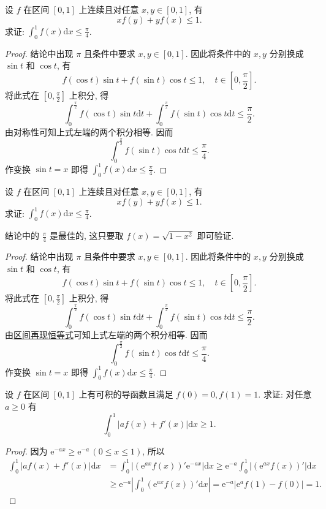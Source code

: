 \documentclass[../../main.tex]{subfiles}
\begin{document}
\begin{example}
设 $f$ 在区间 $[0,1]$ 上连续且对任意 $x,y\in[0,1]$, 有
$$xf(y)+yf(x)\leqslant 1.$$
求证: $\int_0^1 f(x)\mathrm{d}x\leqslant \frac{\pi}{4}$.
\end{example}
\begin{proof}
结论中出现 $\pi$ 且条件中要求 $x,y\in[0,1]$. 因此将条件中的 $x,y$ 分别换成 $\sin t$ 和 $\cos t$, 有
$$f(\cos t)\sin t+f(\sin t)\cos t\leqslant 1,\quad t\in\left[0,\frac{\pi}{2}\right].$$
将此式在 $\left[0,\frac{\pi}{2}\right]$ 上积分, 得
$$\int_0^{\frac{\pi}{2}}f(\cos t)\sin t\mathrm{d}t+\int_0^{\frac{\pi}{2}}f(\sin t)\cos t\mathrm{d}t\leqslant \frac{\pi}{2}.$$
由对称性可知上式左端的两个积分相等. 因而
$$\int_0^{\frac{\pi}{2}}f(\sin t)\cos t\mathrm{d}t\leqslant \frac{\pi}{4}.$$
作变换 $\sin t=x$ 即得 $\int_0^1 f(x)\mathrm{d}x\leqslant \frac{\pi}{4}$.
\end{proof}

\begin{example}
设 $f$ 在区间 $[0,1]$ 上连续且对任意 $x,y\in[0,1]$, 有
$$xf(y)+yf(x)\leqslant 1.$$
求证: $\int_0^1 f(x)\mathrm{d}x\leqslant \frac{\pi}{4}$.
\end{example}
\begin{remark}
结论中的 $\frac{\pi}{4}$ 是最佳的, 这只要取 $f(x)=\sqrt{1-x^2}$ 即可验证.
\end{remark}
\begin{proof}
结论中出现 $\pi$ 且条件中要求 $x,y\in[0,1]$. 因此将条件中的 $x,y$ 分别换成 $\sin t$ 和 $\cos t$, 有
$$f(\cos t)\sin t+f(\sin t)\cos t\leqslant 1,\quad t\in\left[0,\frac{\pi}{2}\right].$$
将此式在 $\left[0,\frac{\pi}{2}\right]$ 上积分, 得
$$\int_0^{\frac{\pi}{2}}f(\cos t)\sin t\mathrm{d}t+\int_0^{\frac{\pi}{2}}f(\sin t)\cos t\mathrm{d}t\leqslant \frac{\pi}{2}.$$
由\hyperref[theorem:区间再现恒等式]{区间再现恒等式}可知上式左端的两个积分相等. 因而
$$\int_0^{\frac{\pi}{2}}f(\sin t)\cos t\mathrm{d}t\leqslant \frac{\pi}{4}.$$
作变换 $\sin t=x$ 即得 $\int_0^1 f(x)\mathrm{d}x\leqslant \frac{\pi}{4}$.
\end{proof}

\begin{example}
设 $f$ 在区间 $[0,1]$ 上有可积的导函数且满足 $f(0)=0,f(1)=1$. 求证: 对任意 $a\geqslant 0$ 有
$$\int_0^1|af(x)+f'(x)|\mathrm{d}x\geqslant 1.$$
\end{example}
\begin{proof}
因为 $\mathrm{e}^{-ax}\geqslant \mathrm{e}^{-a}\,(0\leqslant  x\leqslant 1)$, 所以
$$
\begin{aligned}
\int_0^1|af(x)+f'(x)|\mathrm{d}x &= \int_0^1|(\mathrm{e}^{ax}f(x))'\mathrm{e}^{-ax}|\mathrm{d}x \geqslant  \mathrm{e}^{-a}\int_0^1|(\mathrm{e}^{ax}f(x))'|\mathrm{d}x \\
&\geqslant  \mathrm{e}^{-a}\left|\int_0^1(\mathrm{e}^{ax}f(x))'\mathrm{d}x\right| = \mathrm{e}^{-a}|\mathrm{e}^{a}f(1)-f(0)| = 1.
\end{aligned}
$$
\end{proof}
\end{document}
